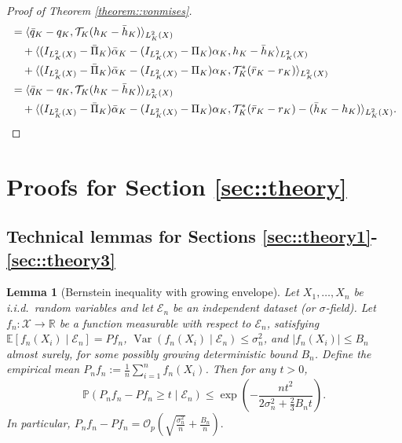 \documentclass[11pt]{article}
\theoremstyle{plain}
\newtheorem{lemma}{Lemma}
\theoremstyle{definition}
\theoremstyle{remark}
\theoremstyle{definition}
\begin{document}
\begin{proof}[Proof of Theorem \ref{theorem::vonmises}]
\begin{align*}
        &=    \langle \bar q_K - q_K, \mathcal{T}_K( h_K - \bar h_K ) \rangle_{L_K^2(X)}\notag \\
    &\quad +   \langle (I_{L_K^2(X)} - \bar \Pi_K) \bar \alpha_K - (I_{L_K^2(X)} - \Pi_K)\alpha_K , h_K - \bar h_K \rangle_{L_K^2(X)}\\
     &\quad + \langle (I_{L_K^2(X)} - \bar \Pi_K) \bar \alpha_K - (I_{L_K^2(X)} - \Pi_K)\alpha_K, \mathcal{T}_K^*(\bar r_K - r_K) \rangle_{L_K^2(X)}\\
     &=    \langle \bar q_K - q_K, \mathcal{T}_K( h_K - \bar h_K ) \rangle_{L_K^2(X)}\notag \\
    &\quad +   \langle (I_{L_K^2(X)} - \bar \Pi_K) \bar \alpha_K - (I_{L_K^2(X)} - \Pi_K)\alpha_K ,  \mathcal{T}_K^*(\bar r_K - r_K)  - ( \bar h_K - h_K) \rangle_{L_K^2(X)}.
\end{align*}


 
 
\end{proof}



 \section{Proofs for Section \ref{sec::theory}}

 

\subsection{Technical lemmas for Sections \ref{sec::theory1}-\ref{sec::theory3}}

\begin{lemma}[Bernstein inequality with growing envelope]
Let \( X_1, \dots, X_n \) be i.i.d.\ random variables and let \( \mathcal{E}_n \) be an independent dataset (or \(\sigma\)-field). Let \( f_n : \mathcal{X} \to \mathbb{R} \) be a function measurable with respect to \( \mathcal{E}_n \), satisfying \( \mathbb{E}[f_n(X_i) \mid \mathcal{E}_n] = P f_n \), \( \operatorname{Var}(f_n(X_i) \mid \mathcal{E}_n) \le \sigma_{n}^2 \), and \( |f_n(X_i)| \le B_n \) almost surely, for some possibly growing deterministic bound \( B_n \). Define the empirical mean \( P_n f_n := \frac{1}{n} \sum_{i=1}^n f_n(X_i) \). Then for any \( t > 0 \),
\[
\mathbb{P}\left( P_n f_n - P f_n \ge t \mid \mathcal{E}_n \right) \le \exp\left( - \frac{n t^2}{2 \sigma_{n}^2 + \frac{2}{3} B_n t} \right).
\]
In particular, $P_n f_n - P f_n = \mathcal{O}_p\left( \sqrt{\frac{\sigma_n^2}{n}} + \frac{B_n}{n} \right).$
\label{lemma::bernstein}
\end{lemma}
\end{document}
